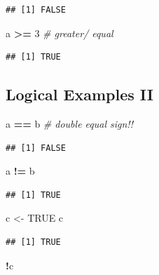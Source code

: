 \documentclass[
]{book}
\newenvironment{Shaded}{\begin{snugshade}}{\end{snugshade}}
\newcommand{\CommentTok}[1]{\textcolor[rgb]{0.56,0.35,0.01}{\textit{#1}}}
\newcommand{\ConstantTok}[1]{\textcolor[rgb]{0.56,0.35,0.01}{#1}}
\newcommand{\DecValTok}[1]{\textcolor[rgb]{0.00,0.00,0.81}{#1}}
\newcommand{\NormalTok}[1]{#1}
\newcommand{\OtherTok}[1]{\textcolor[rgb]{0.56,0.35,0.01}{#1}}
\newcommand{\SpecialCharTok}[1]{\textcolor[rgb]{0.81,0.36,0.00}{\textbf{#1}}}
\begin{document}
\begin{verbatim}
## [1] FALSE
\end{verbatim}

\begin{Shaded}
\begin{Highlighting}[]
\NormalTok{a }\SpecialCharTok{\textgreater{}=} \DecValTok{3} \CommentTok{\# greater/ equal}
\end{Highlighting}
\end{Shaded}

\begin{verbatim}
## [1] TRUE
\end{verbatim}

\subsection{Logical Examples II}\label{logical-examples-ii}

\begin{Shaded}
\begin{Highlighting}[]
\NormalTok{a }\SpecialCharTok{==}\NormalTok{ b }\CommentTok{\# double equal sign!!}
\end{Highlighting}
\end{Shaded}

\begin{verbatim}
## [1] FALSE
\end{verbatim}

\begin{Shaded}
\begin{Highlighting}[]
\NormalTok{a }\SpecialCharTok{!=}\NormalTok{ b}
\end{Highlighting}
\end{Shaded}

\begin{verbatim}
## [1] TRUE
\end{verbatim}

\begin{Shaded}
\begin{Highlighting}[]
\NormalTok{c }\OtherTok{\textless{}{-}} \ConstantTok{TRUE}
\NormalTok{c}
\end{Highlighting}
\end{Shaded}

\begin{verbatim}
## [1] TRUE
\end{verbatim}

\begin{Shaded}
\begin{Highlighting}[]
\SpecialCharTok{!}\NormalTok{c}
\end{Highlighting}
\end{Shaded}
\end{document}

